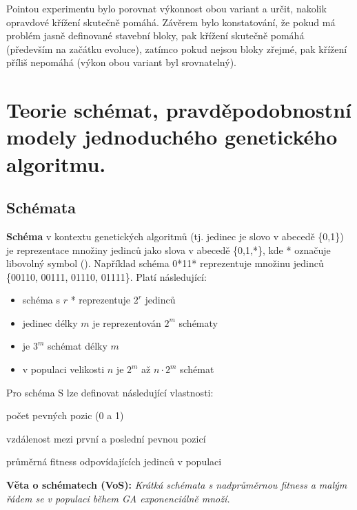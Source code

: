 Pointou experimentu bylo porovnat výkonnost obou variant a určit, nakolik opravdové křížení skutečně pomáhá. Závěrem bylo konstatování, že pokud má problém jasně definované stavební bloky, pak křížení skutečně pomáhá (především na začátku evoluce), zatímco pokud nejsou bloky zřejmé, pak křížení příliš nepomáhá (výkon obou variant byl srovnatelný).

\section{Teorie schémat, pravděpodobnostní modely jednoduchého genetického algoritmu.}
\subsection{Schémata}
\textbf{Schéma} v kontextu genetických algoritmů (tj. jedinec je slovo v abecedě \{0,1\}) je reprezentace množiny jedinců jako slova v abecedě \{0,1,*\}, kde * označuje libovolný symbol (). Například schéma 0*11* reprezentuje množinu jedinců \{00110, 00111, 01110, 01111\}. Platí následující:
\begin{itemize}
	\leftskip 20pt
	\setlength{\itemsep}{0pt}
	\item schéma s $r$ * reprezentuje $2^r$ jedinců
	\item jedinec délky $m$ je reprezentován $2^m$ schématy
	\item je $3^m$ schémat délky $m$
	\item v populaci velikosti $n$ je $2^m$ až $n\cdot2^m$ schémat
\end{itemize}
Pro schéma S lze definovat následující vlastnosti:
\begin{description}
	\leftskip 20pt
	\setlength{\itemsep}{0pt}
	\item[Řád schématu o(S):] počet pevných pozic (0 a 1) 
	\item[Definující délka d(S):] vzdálenost mezi první a poslední pevnou pozicí
	\item[Fitness F(S)] průměrná fitness odpovídajících jedinců v populaci
\end{description}

\noindent\textbf{Věta o schématech (VoS):} \textit{Krátká schémata s nadprůměrnou fitness a malým řádem se v populaci během GA exponenciálně množí.}


